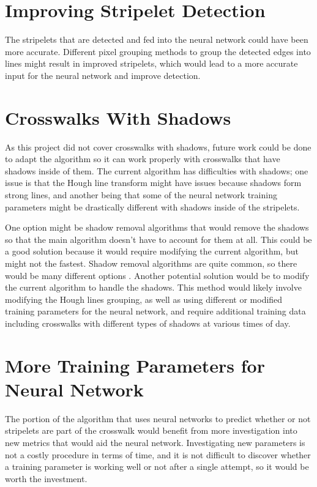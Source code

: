 \documentclass[12pt]{ucthesis}
\begin{document}
\section{Improving Stripelet Detection}

The stripelets that are detected and fed into the neural network could have been more accurate. Different pixel grouping methods to group the detected edges into lines might result in improved stripelets, which would lead to a more accurate input for the neural network and improve detection.

\section{Crosswalks With Shadows}

As this project did not cover crosswalks with shadows, future work could be done to adapt the algorithm so it can work properly with crosswalks that have shadows inside of them. The current algorithm has difficulties with shadows; one issue is that the Hough line transform might have issues because shadows form strong lines, and another being that some of the neural network training parameters might be drastically different with shadows inside of the stripelets. 

One option might be shadow removal algorithms that would remove the shadows so that the main algorithm doesn't have to account for them at all. This could be a good solution because it would require modifying the current algorithm, but might not the fastest. Shadow removal algorithms are quite common, so there would be many different options \cite{shadowRemoval}. Another potential solution would be to modify the current algorithm to handle the shadows. This method would likely involve modifying the Hough lines grouping, as well as using different or modified training parameters for the neural network, and require additional training data including crosswalks with different types of shadows at various times of day. 

\section{More Training Parameters for Neural Network}

The portion of the algorithm that uses neural networks to predict whether or not stripelets are part of the crosswalk would benefit from more investigation into new metrics that would aid the neural network. Investigating new parameters is not a costly procedure in terms of time, and it is not difficult to discover whether a training parameter is working well or not after a single attempt, so it would be worth the investment.  
\end{document}
